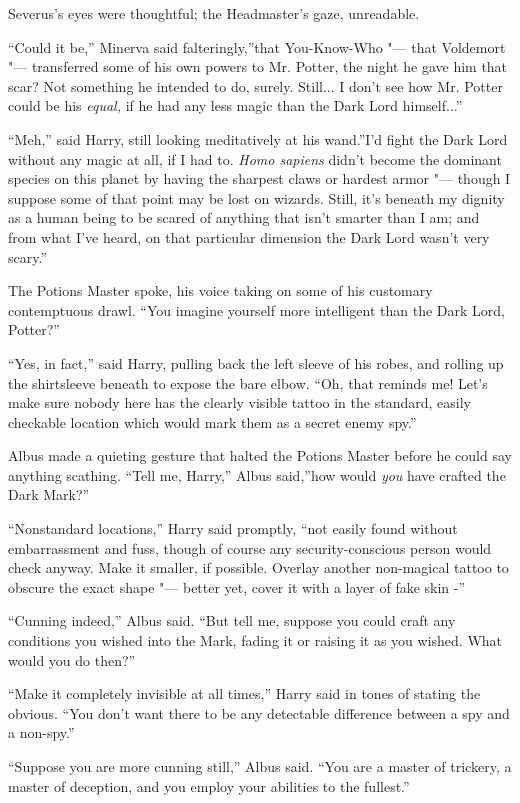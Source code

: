 Severus's eyes were thoughtful; the Headmaster's gaze, unreadable.

``Could it be,'' Minerva said falteringly,''that You-Know-Who "--- that
Voldemort "--- transferred some of his own powers to Mr. Potter, the night
he gave him that scar? Not something he intended to do, surely.
Still... I don't see how Mr. Potter could be his \emph{equal,} if
he had any less magic than the Dark Lord himself...''

``Meh,'' said Harry, still looking meditatively at his wand.''I'd fight
the Dark Lord without any magic at all, if I had to. \emph{Homo sapiens}
didn't become the dominant species on this planet by having the sharpest
claws or hardest armor "--- though I suppose some of that point may be lost
on wizards. Still, it's beneath my dignity as a human being to be scared
of anything that isn't smarter than I am; and from what I've heard, on
that particular dimension the Dark Lord wasn't very scary.''

The Potions Master spoke, his voice taking on some of his customary
contemptuous drawl. ``You imagine yourself more intelligent than the
Dark Lord, Potter?''

``Yes, in fact,'' said Harry, pulling back the left sleeve of his robes,
and rolling up the shirtsleeve beneath to expose the bare elbow. ``Oh,
that reminds me! Let's make sure nobody here has the clearly visible
tattoo in the standard, easily checkable location which would mark them
as a secret enemy spy.''

Albus made a quieting gesture that halted the Potions Master before he
could say anything scathing. ``Tell me, Harry,'' Albus said,''how would
\emph{you} have crafted the Dark Mark?''

``Nonstandard locations,'' Harry said promptly, ``not easily found
without embarrassment and fuss, though of course any security-conscious
person would check anyway. Make it smaller, if possible. Overlay another
non-magical tattoo to obscure the exact shape "--- better yet, cover it
with a layer of fake skin -''

``Cunning indeed,'' Albus said. ``But tell me, suppose you could craft
any conditions you wished into the Mark, fading it or raising it as you
wished. What would you do then?''

``Make it completely invisible at all times,'' Harry said in tones of
stating the obvious. ``You don't want there to be any detectable
difference between a spy and a non-spy.''

``Suppose you are more cunning still,'' Albus said. ``You are a master
of trickery, a master of deception, and you employ your abilities to the
fullest.''

